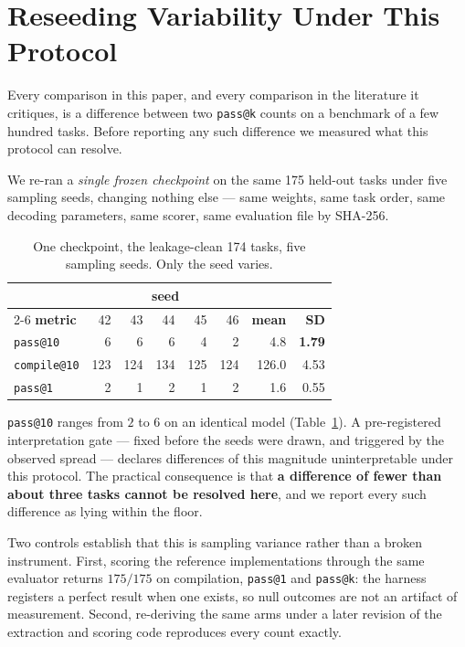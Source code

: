 \documentclass[conference]{IEEEtran}
\makeatletter
\newcommand{\passatk}{\texttt{pass@k}\xspace}
\newcommand{\passat}[1]{\texttt{pass@#1}\xspace}
\newcommand{\compileat}[1]{\texttt{compile@#1}\xspace}
\makeatother
\begin{document}
\section{Reseeding Variability Under This Protocol}
\label{sec:floor}
Every comparison in this paper, and every comparison in the literature it
critiques, is a difference between two \passatk counts on a benchmark of a few
hundred tasks. Before reporting any such difference we measured what this
protocol can resolve.

We re-ran a \emph{single frozen checkpoint} on the same 175 held-out tasks under
five sampling seeds, changing nothing else --- same weights, same task order,
same decoding parameters, same scorer, same evaluation file by SHA-256.

\begin{table}[t]
\caption{One checkpoint, the leakage-clean 174 tasks, five sampling seeds. Only the seed varies.}
\label{tab:floor}
\centering
\footnotesize
\begin{tabular}{@{}lrrrrrrr@{}}
\toprule
 & \multicolumn{5}{c}{seed} & & \\
\cmidrule(lr){2-6}
\textbf{metric} & 42 & 43 & 44 & 45 & 46 & \textbf{mean} & \textbf{SD} \\
\midrule
\passat{10}   & 6 & 6 & 6 & 4 & 2 & 4.8 & \textbf{1.79} \\
\compileat{10} & 123 & 124 & 134 & 125 & 124 & 126.0 & 4.53 \\
\passat{1}    & 2 & 1 & 2 & 1 & 2 & 1.6 & 0.55 \\
\bottomrule
\end{tabular}
\end{table}

\passat{10} ranges from $2$ to $6$ on an identical model
(Table~\ref{tab:floor}). A pre-registered interpretation gate --- fixed before
the seeds were drawn, and triggered by the observed spread --- declares
differences of this magnitude uninterpretable under this protocol. The practical
consequence is that \textbf{a difference of fewer than about three tasks cannot
be resolved here}, and we report every such difference as lying within the floor.

Two controls establish that this is sampling variance rather than a broken
instrument. First, scoring the reference implementations through the same
evaluator returns $175/175$ on compilation, \passat{1} and \passatk: the harness
registers a perfect result when one exists, so null outcomes are not an artifact
of measurement. Second, re-deriving the same arms under a later revision of the
extraction and scoring code reproduces every count exactly.
\end{document}
